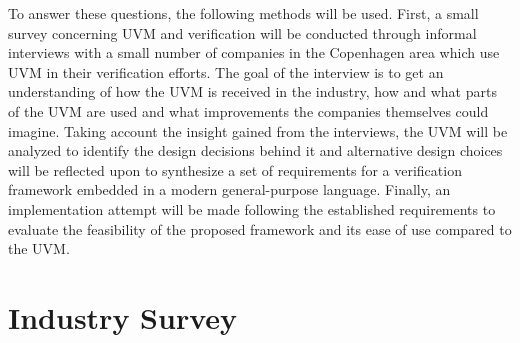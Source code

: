 \documentclass[11pt,a4paper]{report}
\begin{document}
To answer these questions, the following methods will be used. First, a small survey concerning UVM and verification
will be conducted through informal interviews with a small number of companies in the Copenhagen area which use UVM
in their verification efforts. The goal of the interview is to get an understanding of how the UVM is received in the
industry, how and what parts of the UVM are used and what improvements the companies themselves could imagine. Taking
account the insight gained from the interviews, the UVM will be analyzed to identify the design decisions behind it
and alternative design choices will be reflected upon to synthesize a set of requirements for a verification
framework embedded in a modern general-purpose language. Finally, an implementation attempt will be made following
the established requirements to evaluate the feasibility of the proposed framework and its ease of use compared to the UVM.

\chapter{Industry Survey} %
\end{document}
